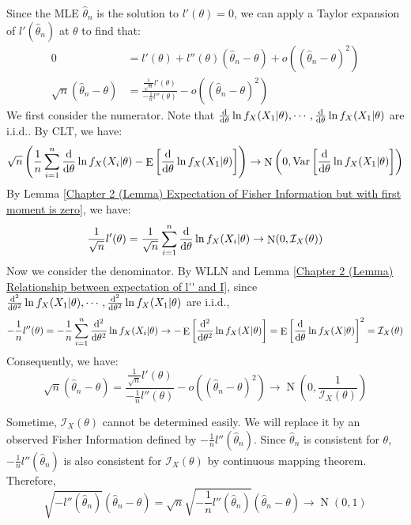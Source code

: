 \documentclass{huhtakm-template-book-v2}
\DeclareMathOperator{\E}{E}
\DeclareMathOperator{\Var}{Var}
\DeclareMathOperator{\N}{N}
\begin{document}
\begin{proofing}
	Since the MLE $\hat{\theta}_{n}$ is the solution to $l'(\theta)=0$, we can apply a Taylor expansion of $l'(\hat{\theta}_{n})$ at $\theta$ to find that:
	\begin{align*}
		0&=l'(\theta)+l''(\theta)(\hat{\theta}_{n}-\theta)+o((\hat{\theta}_{n}-\theta)^{2})\\
		\sqrt{n}(\hat{\theta}_{n}-\theta)&=\frac{\frac{1}{\sqrt{n}}l'(\theta)}{-\frac{1}{n}l''(\theta)}-o((\hat{\theta}_{n}-\theta)^{2})
	\end{align*}
	We first consider the numerator. Note that $\odv*{}{\theta}\ln{f_{X}(X_{1}|\theta)},\cdots,\odv*{}{\theta}\ln{f_{X}(X_{1}|\theta)}$ are i.i.d.. By CLT, we have:
	\begin{equation*}
		\sqrt{n}\left(\frac{1}{n}\sum_{i=1}^{n}\odv*{}{\theta}\ln{f_{X}(X_{i}|\theta)}-\E\left[\odv*{}{\theta}\ln{f_{X}(X_{1}|\theta)}\right]\right)\to\N\left(0,\Var\left[\odv*{}{\theta}\ln{f_{X}(X_{1}|\theta)}\right]\right)
	\end{equation*}
	By Lemma \ref{Chapter 2 (Lemma) Expectation of Fisher Information but with first moment is zero}, we have:
	\begin{equation*}
		\frac{1}{\sqrt{n}}l'(\theta)=\frac{1}{\sqrt{n}}\sum_{i=1}^{n}\odv*{}{\theta}\ln{f_{X}(X_{i}|\theta)}\to\N(0,\mathcal{I}_{X}(\theta))
	\end{equation*}
	Now we consider the denominator. By WLLN and Lemma \ref{Chapter 2 (Lemma) Relationship between expectation of l'' and I}, since $\odv*[order={2}]{}{\theta}\ln{f_{X}(X_{1}|\theta)},\cdots,\odv*[order={2}]{}{\theta}\ln{f_{X}(X_{1}|\theta)}$ are i.i.d.,
	\begin{equation*}
		-\frac{1}{n}l''(\theta)=-\frac{1}{n}\sum_{i=1}^{n}\odv*[order={2}]{}{\theta}\ln{f_{X}(X_{i}|\theta)}\to-\E\left[\odv*[order={2}]{}{\theta}\ln{f_{X}(X|\theta)}\right]=\E\left[\odv*{}{\theta}\ln{f_{X}(X|\theta)}\right]^{2}=\mathcal{I}_{X}(\theta)
	\end{equation*}
	Consequently, we have:
	\begin{equation*}
		\sqrt{n}(\hat{\theta}_{n}-\theta)=\frac{\frac{1}{\sqrt{n}}l'(\theta)}{-\frac{1}{n}l''(\theta)}-o((\hat{\theta}_{n}-\theta)^{2})\to\N\left(0,\frac{1}{\mathcal{I}_{X}(\theta)}\right)
	\end{equation*}
\end{proofing}
\begin{rem}
	Sometime, $\mathcal{I}_{X}(\theta)$ cannot be determined easily. We will replace it by an observed Fisher Information defined by $-\frac{1}{n}l''(\hat{\theta}_{n})$. Since $\hat{\theta}_{n}$ is consistent for $\theta$, $-\frac{1}{n}l''(\hat{\theta}_{n})$ is also consistent for $\mathcal{I}_{X}(\theta)$ by continuous mapping theorem. Therefore,
	\begin{equation*}
		\sqrt{-l''(\hat{\theta}_{n})}(\hat{\theta}_{n}-\theta)=\sqrt{n}\sqrt{-\frac{1}{n}l''(\hat{\theta}_{n})}(\hat{\theta}_{n}-\theta)\to\N(0,1)
	\end{equation*}
\end{rem}
\end{document}
